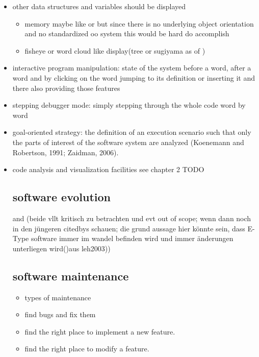 \begin{itemize}

\item other data structures and variables should be displayed
	\begin{itemize}
	\item memory maybe like \cite{ReissProgrammingEnvironments1995} or \cite{Aftandilian:2010:HIH:1879211.1879222} but since there is no underlying object orientation and no standardized oo system this would be hard do accomplish
	\item fisheye or word cloud like display(tree or sugiyama as of \cite{Storey:1997:IVT:857188.857642})
	\end{itemize}
	
\item interactive program manipulation: state of the system before a word, after a word and by clicking on the word jumping to its definition or inserting it and there also providing those features

\item stepping debugger mode: simply stepping through the whole code word by word

\item goal-oriented strategy: the definition of an execution scenario such that only the parts of interest of the software system are analyzed (Koenemann and Robertson, 1991; Zaidman,
2006).

\item code analysis and visualization facilities see chapter 2 TODO


\subsection{software evolution}

\cite{Lehman:1985:PEP:7261} and \cite{Lehman:2003:SEB:950401.950407} (beide vllt kritisch zu betrachten und evt out of scope; wenn dann noch in den jüngeren citedbys schauen; die grund aussage hier könnte sein, dass E-Type software immer im wandel befinden wird und immer änderungen unterliegen wird()aus leh2003))

\subsection{software maintenance}

\begin{itemize}
\item types of maintenance
\item find bugs and fix them
\item find the right place to implement a new feature.
\item find the right place to modify a feature.
\end{itemize}


\end{itemize}
